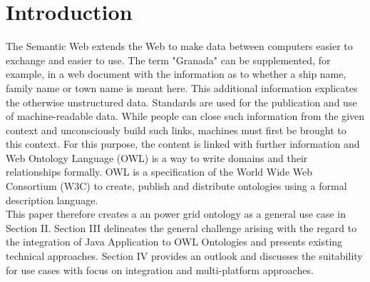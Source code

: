 \section{Introduction}

The Semantic Web extends the Web to make data between computers easier to exchange and easier to use. The term "Granada"
can be supplemented, for example, in a web document with the information as to whether a ship name, family name or town
name is meant here. This additional information explicates the otherwise unstructured data. Standards are used for the
publication and use of machine-readable data. While people can close such information from the given context and
unconsciously build such links, machines must first be brought to this context. For this purpose, the content is linked
with further information and Web Ontology Language (OWL) is a way to write domains and their relationships formally. OWL
is a specification of the World Wide Web Consortium (W3C) to create, publish and distribute ontologies using a formal
description language.\\

This paper therefore creates a an power grid ontology as a general use case in Section II. Section III delineates the general challenge arising with the regard to the integration of Java Application to OWL Ontologies and presents existing technical approaches. Section IV provides an outlook and discusses the suitability for use cases with focus on integration and multi-platform approaches.
\newpage